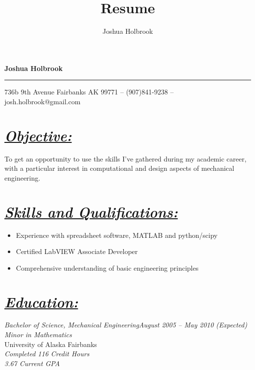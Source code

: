 \documentclass[10pt, letterpaper]{article}
\title{Resume}
\author{Joshua Holbrook}
\begin{document}
\textbf{\Huge{Joshua Holbrook}}\hrule
\smallskip\small 736b 9th Avenue  Fairbanks AK 99771 -- (907)841-9238 -- josh.holbrook@gmail.com \normalsize

\section*{\underline{\textit{Objective:}}}
\small To get an opportunity to use the skills I've gathered during my academic career,
with a particular interest in computational and design aspects of mechanical
engineering.\normalsize

\section*{\underline{\textit{Skills and Qualifications:}}}
\small\begin{itemize}
\item Experience with spreadsheet software, MATLAB and python/scipy
\item Certified LabVIEW Associate Developer
\item Comprehensive understanding of basic engineering principles
\end{itemize}\normalsize

\section*{\underline{\textit{Education:}}}
\large\textit{Bachelor of Science, Mechanical Engineering\hfill August 2005 --
May 2010 (Expected)}\normalsize \\
\textit{Minor in Mathematics}\\
University of Alaska Fairbanks\\
\emph{Completed 116 Credit Hours}\\
\emph{3.67 Current GPA}

\end{document}
